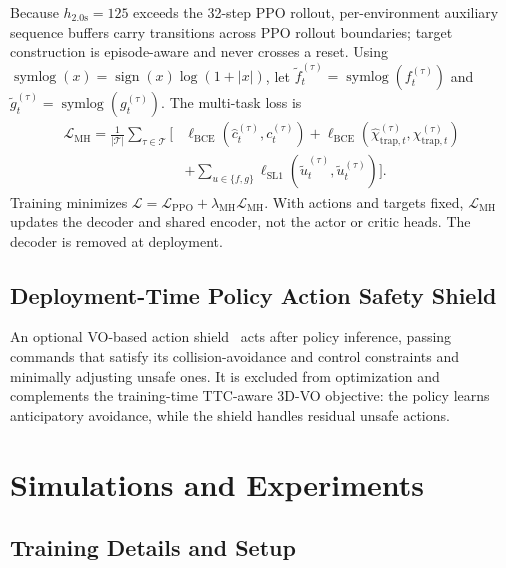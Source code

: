 \documentclass[letterpaper, 10 pt, conference]{ieeeconf}
\begin{document}
Because \(h_{2.0\mathrm{s}}=125\) exceeds the 32-step PPO rollout, per-environment auxiliary sequence buffers carry transitions across PPO rollout boundaries; target construction is episode-aware and never crosses a reset. Using \(\operatorname{symlog}(x)=\operatorname{sign}(x)\log(1+|x|)\), let \(\tilde{f}_t^{(\tau)}=\operatorname{symlog}(f_t^{(\tau)})\) and \(\tilde{g}_t^{(\tau)}=\operatorname{symlog}(g_t^{(\tau)})\). The multi-task loss is
\begin{equation}
	\begin{aligned}
	\mathcal{L}_{\mathrm{MH}}=\frac{1}{|\mathcal{T}|}\sum_{\tau\in\mathcal{T}}\bigl[
	&\ell_{\mathrm{BCE}}(\hat{c}_t^{(\tau)},c_t^{(\tau)})
	+\ell_{\mathrm{BCE}}(\hat{\chi}_{\mathrm{trap},t}^{(\tau)},\chi_{\mathrm{trap},t}^{(\tau)})\\[-1mm]
	&+\!\sum_{u\in\{f,g\}}\ell_{\mathrm{SL1}}(\widehat{\tilde{u}}_t^{(\tau)},\tilde{u}_t^{(\tau)})\bigr].
	\end{aligned}
	\label{eq:multi_horizon_loss}
\end{equation}
Training minimizes \(\mathcal{L}=\mathcal{L}_{\mathrm{PPO}}+\lambda_{\mathrm{MH}}\mathcal{L}_{\mathrm{MH}}\). With actions and targets fixed, \(\mathcal{L}_{\mathrm{MH}}\) updates the decoder and shared encoder, not the actor or critic heads. The decoder is removed at deployment.

\subsection{Deployment-Time Policy Action Safety Shield}\label{subsec:shield}
An optional VO-based action shield~\cite{navrl} acts after policy inference, passing commands that satisfy its collision-avoidance and control constraints and minimally adjusting unsafe ones. It is excluded from optimization and complements the training-time TTC-aware 3D-VO objective: the policy learns anticipatory avoidance, while the shield handles residual unsafe actions.


\suppressfloats[t]
\section{Simulations and Experiments}\label{sec:exp}

\subsection{Training Details and Setup}\label{subsec:Simulation Setup}
\end{document}

